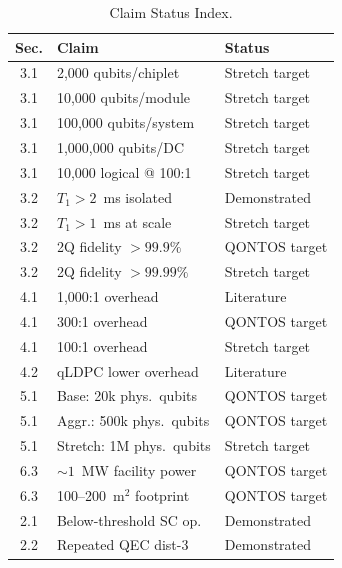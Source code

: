 \documentclass[conference]{IEEEtran}
\begin{document}
\begin{table}[htbp]
\centering
\caption{Claim Status Index.}
\label{tab:claim_index}
\begin{tabular}{clp{2.5cm}}
\toprule
\textbf{Sec.} & \textbf{Claim} & \textbf{Status} \\
\midrule
3.1 & 2,000 qubits/chiplet & Stretch target \\
3.1 & 10,000 qubits/module & Stretch target \\
3.1 & 100,000 qubits/system & Stretch target \\
3.1 & 1,000,000 qubits/DC & Stretch target \\
3.1 & 10,000 logical @ 100:1 & Stretch target \\
3.2 & $T_1 > 2$~ms isolated & Demonstrated~\cite{bland2025} \\
3.2 & $T_1 > 1$~ms at scale & Stretch target \\
3.2 & 2Q fidelity $> 99.9\%$ & QONTOS target \\
3.2 & 2Q fidelity $> 99.99\%$ & Stretch target \\
4.1 & 1,000:1 overhead & Literature~\cite{fowler2012, chamberland2022} \\
4.1 & 300:1 overhead & QONTOS target \\
4.1 & 100:1 overhead & Stretch target \\
4.2 & qLDPC lower overhead & Literature~\cite{bravyi2024, panteleev2022} \\
5.1 & Base: 20k phys.\ qubits & QONTOS target \\
5.1 & Aggr.: 500k phys.\ qubits & QONTOS target \\
5.1 & Stretch: 1M phys.\ qubits & Stretch target \\
6.3 & ${\sim}1$~MW facility power & QONTOS target \\
6.3 & 100--200~m$^2$ footprint & QONTOS target \\
2.1 & Below-threshold SC op. & Demonstrated~\cite{acharya2024} \\
2.2 & Repeated QEC dist-3 & Demonstrated~\cite{krinner2022} \\
\bottomrule
\end{tabular}
\end{table}
\end{document}
